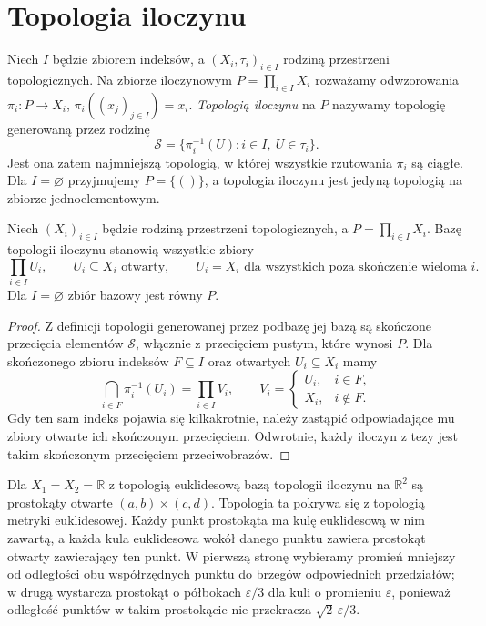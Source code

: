 \section{Topologia iloczynu}
\label{sec:topog-iloczyn}

\begin{definicja}
\label{def:topog-iloczyn}
Niech $I$ będzie zbiorem indeksów, a $(X_i,\tau_i)_{i\in I}$
rodziną przestrzeni topologicznych. Na zbiorze iloczynowym
$P=\prod_{i\in I}X_i$ rozważamy odwzorowania
$\pi_i\colon P\to X_i$, $\pi_i((x_j)_{j\in I})=x_i$.
\emph{Topologią iloczynu} na $P$ nazywamy topologię
generowaną przez rodzinę
\[
\mathcal S=\{\pi_i^{-1}(U):i\in I,\ U\in\tau_i\}.
\]
Jest ona zatem najmniejszą topologią, w której wszystkie
rzutowania $\pi_i$ są ciągłe. Dla $I=\varnothing$
przyjmujemy $P=\{()\}$, a topologia iloczynu jest
jedyną topologią na zbiorze jednoelementowym.
\end{definicja}

\begin{twierdzenie}
\label{thm:topog-iloczyn-baza}
Niech $(X_i)_{i\in I}$ będzie rodziną przestrzeni
topologicznych, a $P=\prod_{i\in I}X_i$.
Bazę topologii iloczynu stanowią wszystkie zbiory
\[
\prod_{i\in I}U_i,\qquad
U_i\subseteq X_i\text{ otwarty},\qquad
U_i=X_i\text{ dla wszystkich poza skończenie wieloma }i.
\]
Dla $I=\varnothing$ zbiór bazowy jest równy $P$.
\end{twierdzenie}
\begin{proof}
Z definicji topologii generowanej przez podbazę jej
bazą są skończone przecięcia elementów $\mathcal S$,
włącznie z przecięciem pustym, które wynosi $P$.
Dla skończonego zbioru indeksów $F\subseteq I$ oraz
otwartych $U_i\subseteq X_i$ mamy
\[
\bigcap_{i\in F}\pi_i^{-1}(U_i)=
\prod_{i\in I}V_i,\qquad
V_i=\begin{cases}U_i,&i\in F,\\X_i,&i\notin F.\end{cases}
\]
Gdy ten sam indeks pojawia się kilkakrotnie, należy
zastąpić odpowiadające mu zbiory otwarte ich skończonym
przecięciem. Odwrotnie, każdy iloczyn z tezy jest takim
skończonym przecięciem przeciwobrazów.
\end{proof}

\begin{przyklad}
\label{ex:topog-iloczyn-prostokaty}
Dla $X_1=X_2=\mathbb R$ z topologią euklidesową bazą
topologii iloczynu na $\mathbb R^2$ są prostokąty otwarte
$(a,b)\times(c,d)$. Topologia ta pokrywa się z topologią
metryki euklidesowej. Każdy punkt prostokąta ma kulę
euklidesową w nim zawartą, a każda kula euklidesowa
wokół danego punktu zawiera prostokąt otwarty zawierający
ten punkt. W pierwszą stronę wybieramy promień mniejszy
od odległości obu współrzędnych punktu do brzegów
odpowiednich przedziałów; w drugą wystarcza prostokąt
o półbokach $\varepsilon/3$ dla kuli o promieniu
$\varepsilon$, ponieważ odległość punktów w takim
prostokącie nie przekracza $\sqrt 2\,\varepsilon/3$.
\end{przyklad}

